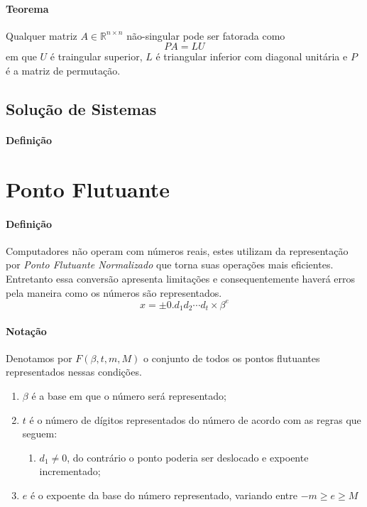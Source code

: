 \documentclass{article}
\begin{document}
            \paragraph{Teorema}Qualquer matriz $A\in\mathbb{R}^{n\times n}$ não-singular pode ser fatorada como \[PA=LU\] em que $U$ é traingular superior, $L$ é triangular inferior com diagonal unitária e $P$ é a matriz de permutação.

        \subsection{Solução de Sistemas}
            \paragraph{Definição}
\newpage

    \section{Ponto Flutuante}
        \paragraph{Definição}Computadores não operam com números reais, estes utilizam da representação por \textit{Ponto Flutuante Normalizado} que torna suas operações mais eficientes. Entretanto essa conversão apresenta limitações e consequentemente haverá erros pela maneira como os números são representados.
            \[x = \pm 0.d_1d_2\cdots d_t\times\beta^{e}\]

        \paragraph{Notação}Denotamos por $F(\beta, t, m, M)$ o conjunto de todos os pontos flutuantes representados nessas condições.
            \begin{enumerate}[noitemsep]
                \item $\beta$ é a base em que o número será representado;
                \item $t$ é o número de dígitos representados do número de acordo com as regras que seguem:
                    \begin{enumerate}[noitemsep]
                        \item $d_1 \neq 0$, do contrário o ponto poderia ser deslocado e expoente incrementado;
                    \end{enumerate}
                \item $e$ é o expoente da base do número representado, variando entre $-m\geq e \geq M$
            \end{enumerate}
\end{document}
